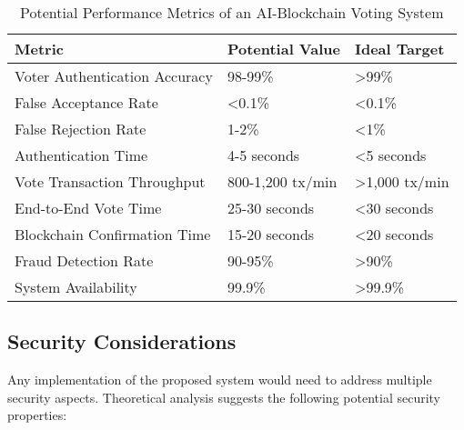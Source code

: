 \documentclass[conference]{IEEEtran}
\begin{document}
\begin{table}[!h]
\caption{Potential Performance Metrics of an AI-Blockchain Voting System}
\label{tab:performance}
\centering
\begin{tabular}{|p{4cm}|p{2cm}|p{2cm}|}
\hline
\textbf{Metric} & \textbf{Potential Value} & \textbf{Ideal Target} \\
\hline
Voter Authentication Accuracy & 98-99\% & >99\% \\
\hline
False Acceptance Rate & <0.1\% & <0.1\% \\
\hline
False Rejection Rate & 1-2\% & <1\% \\
\hline
Authentication Time & 4-5 seconds & <5 seconds \\
\hline
Vote Transaction Throughput & 800-1,200 tx/min & >1,000 tx/min \\
\hline
End-to-End Vote Time & 25-30 seconds & <30 seconds \\
\hline
Blockchain Confirmation Time & 15-20 seconds & <20 seconds \\
\hline
Fraud Detection Rate & 90-95\% & >90\% \\
\hline
System Availability & 99.9\% & >99.9\% \\
\hline
\end{tabular}
\end{table}

\subsection{Security Considerations}
Any implementation of the proposed system would need to address multiple security aspects. Theoretical analysis suggests the following potential security properties:
\end{document}
